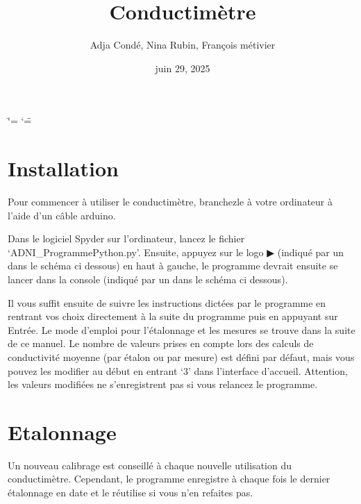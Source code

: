 \documentclass[letterpaper,10pt,french]{sphinxmanual}
\title{Conductimètre}
\date{juin 29, 2025}
\author{Adja Condé, Nina Rubin, François métivier}
\begin{document}
\ifdefined\shorthandoff
  \ifnum\catcode`\=\string=\active\shorthandoff{=}\fi
  \ifnum\catcode`\"=\active{}\fi
\fi

\pagestyle{empty}
\sphinxmaketitle
\pagestyle{plain}
\sphinxtableofcontents
\pagestyle{normal}
\label{\detokenize{index::doc}}


\sphinxstepscope


\chapter{Installation}
\label{\detokenize{Installation:installation}}\label{\detokenize{Installation::doc}}
\sphinxAtStartPar
Pour commencer à utiliser le conductimètre,
branchez\sphinxhyphen{}le à votre ordinateur à l’aide d’un câble
arduino.

\begin{figure}[htbp]
\centering

\noindent{}
\end{figure}

\sphinxAtStartPar
Dans le logiciel Spyder sur l’ordinateur, lancez le
fichier ‘ADNI\_ProgrammePython.py’. Ensuite, appuyez
sur le logo ▶︎ (indiqué par un  dans le schéma ci\sphinxhyphen{} dessous)  en haut à gauche, le programme devrait ensuite se lancer dans
la console (indiqué par un  dans le schéma ci\sphinxhyphen{} dessous).

\begin{figure}[htbp]
\centering

\noindent{}
\end{figure}

\sphinxAtStartPar
Il vous suffit ensuite de suivre les instructions dictées par le programme en rentrant vos choix
directement à la suite du programme puis en appuyant sur Entrée.
Le mode d’emploi pour l’étalonnage et les mesures se trouve
dans la suite de ce manuel.
Le nombre de valeurs prises en compte lors des calculs de
conductivité moyenne (par étalon ou par mesure) est défini par défaut, mais vous pouvez les modifier au début en
entrant ‘3’ dans l’interface d’accueil. Attention, les valeurs modifiées ne s’enregistrent pas si vous
relancez le programme.

\sphinxstepscope


\chapter{Etalonnage}
\label{\detokenize{Etalonnage:etalonnage}}\label{\detokenize{Etalonnage::doc}}
\sphinxAtStartPar
Un nouveau calibrage est conseillé à chaque nouvelle utilisation du conductimètre.
Cependant, le programme enregistre à chaque fois le dernier étalonnage en date et le réutilise si
vous n’en refaites pas.
\end{document}
